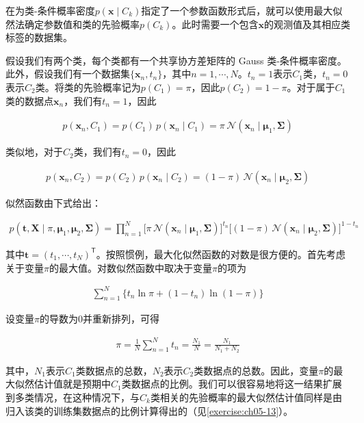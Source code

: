 \documentclass[../../main.tex]{subfiles}
\begin{document}
在为类-条件概率密度$p(\boldsymbol{x}\mid C_k)$指定了一个参数函数形式后，就可以使用最大似然法确定参数值和类的先验概率$p(C_k)$。此时需要一个包含$\boldsymbol{x}$的观测值及其相应类标签的数据集。

假设我们有两个类，每个类都有一个共享协方差矩阵的 Gauss 类-条件概率密度。此外，假设我们有一个数据集$\{\boldsymbol{x}_n,t_n\}$，其中$n=1,\cdots,N$。$t_n=1$表示$C_1$类，$t_n=0$表示$C_2$类。将类的先验概率记为$p(C_1)=\pi$，因此$p(C_2)=1-\pi$。对于属于$C_1$类的数据点$\boldsymbol{x}_n$，我们有$t_n=1$，因此

\begin{align}
  p(\boldsymbol{x}_n,C_1)=p(C_1)\,p(\boldsymbol{x}_n\mid C_1)=\pi\,\mathcal{N}(\boldsymbol{x}_n\mid\boldsymbol{\mu}_1,\boldsymbol{\Sigma})
\end{align}

类似地，对于$C_2$类，我们有$t_n=0$，因此

\begin{align}
  p(\boldsymbol{x}_n,C_2)=p(C_2)\,p(\boldsymbol{x}_n\mid C_2)=(1-\pi)\,\mathcal{N}(\boldsymbol{x}_n\mid\boldsymbol{\mu}_2,\boldsymbol{\Sigma})
\end{align}

似然函数由下式给出：

\begin{align}
  p(\boldsymbol{t},\boldsymbol{X}\mid\pi,\boldsymbol{\mu}_1,\boldsymbol{\mu}_2,\boldsymbol{\Sigma})=\prod_{n=1}^{N}\bigl[\pi\,\mathcal{N}(\boldsymbol{x}_n\mid\boldsymbol{\mu}_1,\boldsymbol{\Sigma})\bigr]^{t_n}\bigl[(1-\pi)\,\mathcal{N}(\boldsymbol{x}_n\mid\boldsymbol{\mu}_2,\boldsymbol{\Sigma})\bigr]^{1-t_n}
  \label{align:ch05-生成似然}
\end{align}

其中$\boldsymbol{t}=(t_1,\cdots,t_N)^{\mathsf{T}}$。按照惯例，最大化似然函数的对数是很方便的。首先考虑关于变量$\pi$的最大值。对数似然函数中取决于变量$\pi$的项为

\begin{align}
  \sum_{n=1}^{N}\bigl\{t_n\ln\pi+(1-t_n)\ln(1-\pi)\bigr\}
  \label{align:ch05-先验项}
\end{align}

设变量$\pi$的导数为0并重新排列，可得

\begin{align}
  \pi=\frac{1}{N}\sum_{n=1}^{N}t_n=\frac{N_1}{N}=\frac{N_1}{N_1+N_2}
  \label{align:ch05-先验ML}
\end{align}

其中，$N_1$表示$C_1$类数据点的总数，$N_2$表示$C_2$类数据点的总数。因此，变量$\pi$的最大似然估计值就是预期中$C_1$类数据点的比例。我们可以很容易地将这一结果扩展到多类情况，在这种情况下，与$C_k$类相关的先验概率的最大似然估计值同样是由归入该类的训练集数据点的比例计算得出的（见\cref{exercise:ch05-13}）。
\end{document}
